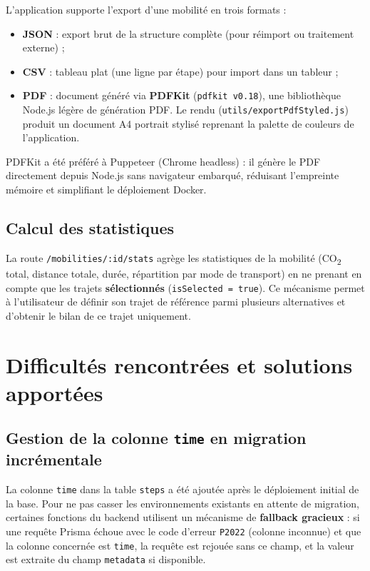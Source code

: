 \documentclass[11pt,a4paper]{article}
\begin{document}
L'application supporte l'export d'une mobilité en trois formats :
\begin{itemize}
  \item \textbf{JSON} : export brut de la structure complète (pour réimport ou traitement externe) ;
  \item \textbf{CSV} : tableau plat (une ligne par étape) pour import dans un tableur ;
  \item \textbf{PDF} : document généré via \textbf{PDFKit} (\texttt{pdfkit v0.18}), une bibliothèque Node.js légère de génération PDF. Le rendu (\texttt{utils/exportPdfStyled.js}) produit un document A4 portrait stylisé reprenant la palette de couleurs de l'application.
\end{itemize}

PDFKit a été préféré à Puppeteer (Chrome headless) : il génère le PDF directement depuis Node.js sans navigateur embarqué, réduisant l'empreinte mémoire et simplifiant le déploiement Docker.

\subsection{Calcul des statistiques}

La route \texttt{/mobilities/:id/stats} agrège les statistiques de la mobilité (CO\textsubscript{2} total, distance totale, durée, répartition par mode de transport) en ne prenant en compte que les trajets \textbf{sélectionnés} (\texttt{isSelected = true}). Ce mécanisme permet à l'utilisateur de définir son trajet de référence parmi plusieurs alternatives et d'obtenir le bilan de ce trajet uniquement.

\newpage
\section{Difficultés rencontrées et solutions apportées}

\subsection{Gestion de la colonne \texttt{time} en migration incrémentale}

La colonne \texttt{time} dans la table \texttt{steps} a été ajoutée après le déploiement initial de la base. Pour ne pas casser les environnements existants en attente de migration, certaines fonctions du backend utilisent un mécanisme de \textbf{fallback gracieux} : si une requête Prisma échoue avec le code d'erreur \texttt{P2022} (colonne inconnue) et que la colonne concernée est \texttt{time}, la requête est rejouée sans ce champ, et la valeur est extraite du champ \texttt{metadata} si disponible.
\end{document}
